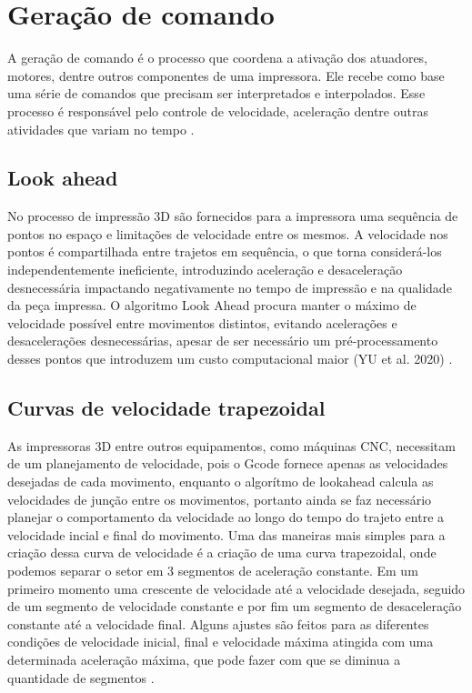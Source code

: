 \section{Geração de comando}
A geração de comando é o processo que coordena a ativação dos 
atuadores, motores, dentre outros componentes de uma impressora. 
Ele recebe como base uma série de comandos que precisam ser 
interpretados e interpolados. Esse processo é responsável pelo 
controle de velocidade, aceleração dentre outras atividades que 
variam no tempo \cite{yu20}. 

\subsection{Look ahead}
No processo de impressão 3D são fornecidos para a impressora 
uma sequência de pontos no espaço e limitações de velocidade 
entre os mesmos. A velocidade nos pontos é compartilhada entre 
trajetos em sequência, o que torna considerá-los 
independentemente ineficiente, introduzindo aceleração e 
desaceleração desnecessária impactando negativamente no tempo 
de impressão e na qualidade da peça impressa.
O algoritmo Look Ahead procura manter o máximo de velocidade 
possível entre movimentos distintos, evitando acelerações e 
desacelerações desnecessárias, apesar de ser necessário um 
pré-processamento desses pontos que introduzem um custo 
computacional maior (YU et al. 2020) \cite{yu20, klipperkinematic}.

\subsection{Curvas de velocidade trapezoidal}
As impressoras 3D entre outros equipamentos, como máquinas CNC, necessitam
de um planejamento de velocidade, pois o Gcode fornece apenas as velocidades desejadas
de cada movimento, enquanto o algorítmo de lookahead calcula as velocidades
de junção entre os movimentos, portanto ainda se faz necessário planejar
o comportamento da velocidade ao longo do tempo do trajeto entre a velocidade incial
e final do movimento.
Uma das maneiras mais simples para a criação dessa curva de velocidade é
a criação de uma curva trapezoidal, onde podemos separar o setor em 3 segmentos
de aceleração constante. Em um primeiro momento uma crescente de velocidade até
a velocidade desejada, seguido de um segmento de velocidade constante e por fim
um segmento de desaceleração constante até a velocidade final.
Alguns ajustes são feitos para as diferentes condições de velocidade inicial, final e
velocidade máxima atingida com uma determinada aceleração máxima, que pode
fazer com que se diminua a quantidade de segmentos \cite{yu20,klipperkinematic}.

